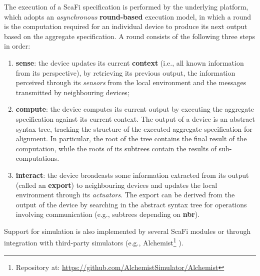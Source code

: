The execution of a \ac{ScaFi} specification is performed by the underlying
platform, which adopts an \textit{asynchronous} \textbf{round-based} execution
model, in which a round is the computation required for an individual device to
produce its next output based on the aggregate specification. A round consists
of the following three steps in order:
\begin{enumerate}
  \item \textbf{sense}: the device updates its current \textbf{context} (i.e.,
        all known information from its perspective), by retrieving its previous
        output, the information perceived through its \textit{sensors} from the
        local environment and the messages transmitted by neighbouring devices;
  \item \textbf{compute}: the device computes its current output by executing
        the aggregate specification against its current context. The output of
        a device is an abstract syntax tree, tracking the structure of the
        executed aggregate specification for alignment. In particular, the root
        of the tree contains the final result of the computation, while the
        roots of its subtrees contain the results of sub-computations.
  \item \textbf{interact}: the device broadcasts some information extracted
        from its output (called an \textbf{export}) to neighbouring devices and
        updates the local environment through its \textit{actuators}. The
        export can be derived from the output of the device by searching in the
        abstract syntax tree for operations involving communication (e.g.,
        subtrees depending on \textbf{nbr}).
\end{enumerate}

Support for simulation is also implemented by several \ac{ScaFi} modules or
through integration with third-party simulators (e.g.,
Alchemist\footnote{Repository at:
\url{https://github.com/AlchemistSimulator/Alchemist}} \cite{Alchemist}).
